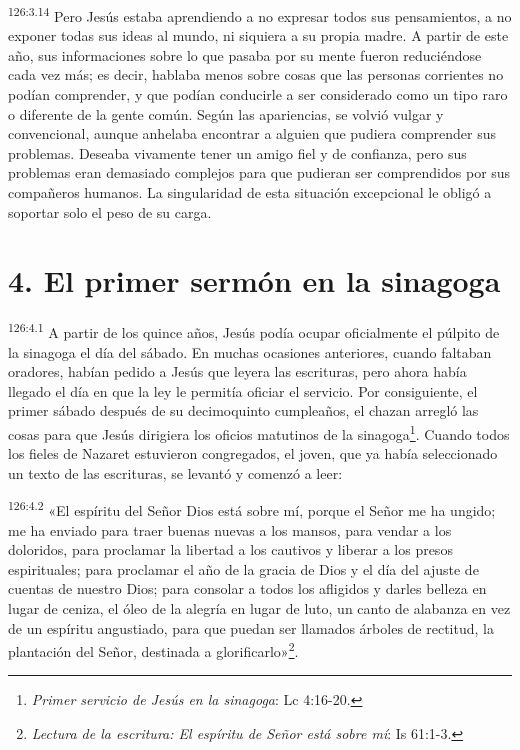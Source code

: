 \par 
\textsuperscript{126:3.14} Pero Jesús estaba aprendiendo a no expresar todos sus pensamientos, a no exponer todas sus ideas al mundo, ni siquiera a su propia madre. A partir de este año, sus informaciones sobre lo que pasaba por su mente fueron reduciéndose cada vez más; es decir, hablaba menos sobre cosas que las personas corrientes no podían comprender, y que podían conducirle a ser considerado como un tipo raro o diferente de la gente común. Según las apariencias, se volvió vulgar y convencional, aunque anhelaba encontrar a alguien que pudiera comprender sus problemas. Deseaba vivamente tener un amigo fiel y de confianza, pero sus problemas eran demasiado complejos para que pudieran ser comprendidos por sus compañeros humanos. La singularidad de esta situación excepcional le obligó a soportar solo el peso de su carga.

\section*{4. El primer sermón en la sinagoga}
\par 
\textsuperscript{126:4.1} A partir de los quince años, Jesús podía ocupar oficialmente el púlpito de la sinagoga el día del sábado. En muchas ocasiones anteriores, cuando faltaban oradores, habían pedido a Jesús que leyera las escrituras, pero ahora había llegado el día en que la ley le permitía oficiar el servicio. Por consiguiente, el primer sábado después de su decimoquinto cumpleaños, el chazan arregló las cosas para que Jesús dirigiera los oficios matutinos de la sinagoga\footnote{\textit{Primer servicio de Jesús en la sinagoga}: Lc 4:16-20.}. Cuando todos los fieles de Nazaret estuvieron congregados, el joven, que ya había seleccionado un texto de las escrituras, se levantó y comenzó a leer:

\par 
\textsuperscript{126:4.2} «El espíritu del Señor Dios está sobre mí, porque el Señor me ha ungido; me ha enviado para traer buenas nuevas a los mansos, para vendar a los doloridos, para proclamar la libertad a los cautivos y liberar a los presos espirituales; para proclamar el año de la gracia de Dios y el día del ajuste de cuentas de nuestro Dios; para consolar a todos los afligidos y darles belleza en lugar de ceniza, el óleo de la alegría en lugar de luto, un canto de alabanza en vez de un espíritu angustiado, para que puedan ser llamados árboles de rectitud, la plantación del Señor, destinada a glorificarlo»\footnote{\textit{Lectura de la escritura: El espíritu de Señor está sobre mí}: Is 61:1-3.}.

